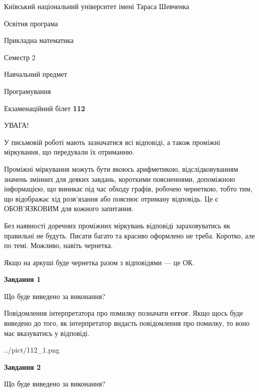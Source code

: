 \documentclass[12pt, ukrainian]{article}
\begin{document}
{{\begin {small}\par
{ \center  Київський національний університет імені Тараса Шевченка \par}
{\parbox {5 cm}{Освітня програма \hfill}{\parbox {7 cm}{Прикладна математика \hfill}}\parbox {6 cm}{\hfill Семестр 2}}\par
{\parbox {5 cm} {Навчальний предмет \hfill}\parbox {7 cm}{Програмування \hfill}\parbox {6cm}{\hfill}\par}\vspace{-7pt} \end{small}}{\center Екзаменаційний білет \No \textbf
{ 112 }\par}}
{
\begin {large}
УВАГА!

У письмовій роботі мають зазначатися всі відповіді, а також проміжні міркування, що передували їх отриманню.

Проміжні міркування можуть бути якоюсь арифметикою, відслідковуванням зна\-чень змінних для деяких завдань,
короткими поясненнями, допоміжною інформацією, що виникає під час обходу графів, робочею чернеткою,
тобто тим, що відображає хід розв’язання або пояснює отриману відповідь.
Це є ОБОВ’ЯЗКОВИМ для кожного запитання.

Без наявності доречних проміжних міркувань відповіді зараховуватись як правиль\-ні не будуть.
Писати багато та красиво оформлено не треба. Коротко, але по темі. Можли\-во, навіть чернетка.

Якщо на аркуші буде чернетка разом з відповідями --- це ОК.

\newpage

{\begin {center}\textbf{Завдання 1}\end {center}}\par
Що буде виведено за виконання?

Повідомлення інтерпретатора про помилку позначати \textbf{error}.
Якщо щось буде виведено до того, як інтерпретатор видасть повідомлення про помилку, 
то воно має вказуватись у відповіді. \par


\begin{center}
	{../pict/112_1.png}
\end{center}
\newpage

{\begin {center}\textbf{Завдання 2}\end {center}}\par
Що буде виведено за виконання?


\end{large}}
\end{document}

